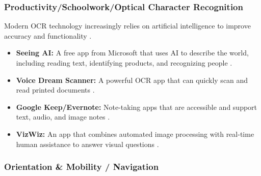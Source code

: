 \subsubsection{Productivity/Schoolwork/Optical Character Recognition}\label{ch2:sssec:ocr-apps}
Modern OCR technology increasingly relies on artificial intelligence to improve accuracy and functionality \supercite{ABBYYAIOCR}.
\begin{itemize}
	\item \textbf{Seeing AI:} A free app from Microsoft that uses AI to describe the world, including reading text, identifying products, and recognizing people \supercite{SeeingAI}.
	\item \textbf{Voice Dream Scanner:} A powerful OCR app that can quickly scan and read printed documents \supercite{VoiceDreamScanner}.
	\item \textbf{Google Keep/Evernote:} Note-taking apps that are accessible and support text, audio, and image notes \supercite{GoogleKeep}.
	\item \textbf{VizWiz:} An app that combines automated image processing with real-time human assistance to answer visual questions \supercite{Bigham2014}.
\end{itemize}

\subsubsection{Orientation \& Mobility / Navigation}

